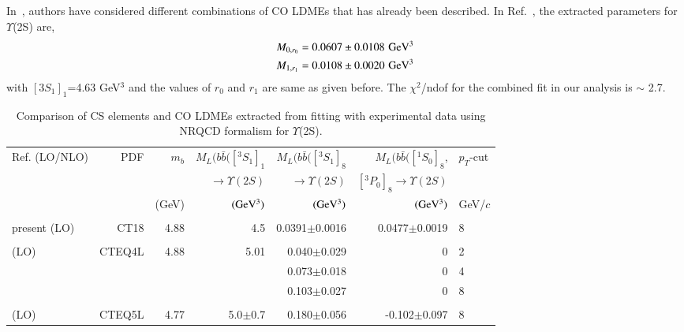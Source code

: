 In~\cite{Domenech:2000ri,Brateen:PRD2001,Sharma:2012dy,Gong:2013qka,Feng:2015wka,Han:2014kxa}, 
authors have considered different combinations of
CO LDMEs that has already been described. In Ref.~\cite{Han:2014kxa}, the extracted 
parameters for $\Upsilon$(2S) are,
\begin{eqnarray}
  \nonumber
  M_{0,r_0}=0.0607\pm0.0108 \,\,{\rm GeV^3}\\ \nonumber
  M_{1,r_1}=0.0108\pm0.0020 \,\,{\rm GeV^3}
\end{eqnarray}
with $[3S_1]_1$=4.63 GeV$^3$ and the values of $r_0$ and $r_1$ are same as given before.
The $\chi^2$/ndof for the 
combined fit in our analysis is $\sim$ 2.7.

\begin{table}
  \centering
  \caption{Comparison of CS elements and CO LDMEs extracted from fitting with experimental data
    using NRQCD formalism for $\Upsilon$(2S).}
  \footnotesize
  \begin{tabular*}{\textwidth}{@{\extracolsep{\fill}}lrrrrrl@{}}
    \hline
    \hline
    Ref. (LO/NLO) & PDF & $m_b$ & $M_L(b\bar{b}([^3S_1]_1$ & $M_L(b\bar{b}([^3S_1]_8$ & 
    $M_L(b\bar{b}([^1S_0]_8$, & $p_T$-cut \\
    & & & $\rightarrow\Upsilon(2S)$ & $\rightarrow\Upsilon(2S)$ & $[^3P_0]_8\rightarrow\Upsilon(2S)$ & \\
    & & (GeV) & $({\rm GeV^3})$ & $({\rm GeV^3})$ & $({\rm GeV^3})$ & GeV/$c$ \\
    \hline
    \hline
    & & & & & & \\
    present (LO) & CT18 &4.88 &4.5 &0.0391$\pm$0.0016 & 0.0477$\pm$0.0019 & 8   \\
    & & & & & & \\
    \cite{Domenech:2000ri} (LO) & CTEQ4L & 4.88 & 5.01 & 0.040$\pm$0.029 & 0 & 2 \\
    & & & & 0.073$\pm$0.018 & 0 & 4 \\
    & & & & 0.103$\pm$0.027 & 0 & 8 \\
    & & & & & & \\
    \cite{Brateen:PRD2001} (LO) & CTEQ5L & 4.77 & 5.0$\pm$0.7 & 0.180$\pm$0.056 & -0.102$\pm$0.097 & 8 \\

\end{tabular*}
\end{table}
